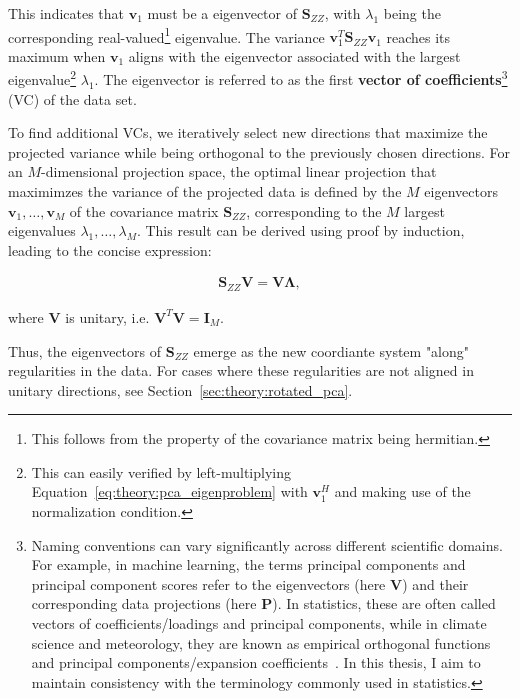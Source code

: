 This indicates that $\bm{v}_1$ must be a eigenvector of $\bm{S}_{ZZ}$, with $\lambda_1$ being the corresponding real-valued\footnote{This follows from the property of the covariance matrix being hermitian.} eigenvalue. The variance $\bm{v}_1^T\bm{S}_{ZZ}\bm{v}_1$ reaches its maximum when $\bm{v}_1$ aligns with the eigenvector associated  with the largest eigenvalue\footnote{This can easily verified by left-multiplying Equation~\eqref{eq:theory:pca_eigenproblem} with $\bm{v}_1^H$ and making use of the normalization condition.} $\lambda_1$. The eigenvector is referred to as the first \textbf{vector of coefficients}\footnote{Naming conventions can vary significantly across different scientific domains. For example, in machine learning, the terms principal components and principal component scores refer to the eigenvectors (here $\bm{V}$) and their corresponding data projections (here $\bm{P}$)\cite[e.g.][]{bishop_pattern_2006}. In statistics, these are often called vectors of coefficients/loadings and principal components\cite[e.g.][]{jolliffe_principal_2002}, while in climate science and meteorology, they are known as empirical orthogonal functions and principal components/expansion coefficients~\cite[e.g.][]{storch_statistical_2003}. In this thesis, I aim to maintain consistency with the terminology commonly used in statistics.} (VC) of the data set.

To find additional VCs, we iteratively select new directions that maximize the projected variance while being orthogonal to the previously chosen directions. For an $M$-dimensional projection space, the optimal linear projection that maximimzes the variance of the projected data is defined by the $M$ eigenvectors $\bm{v}_1,\dots,\bm{v}_M$ of the covariance matrix $\bm{S}_{ZZ}$, corresponding to the $M$ largest eigenvalues $\lambda_1,\dots,\lambda_M$. This result can be derived using proof by induction, leading to the concise expression:

\begin{align}\label{eq:theory:pca_eigenvector_decomposition}
    \bm{S}_{ZZ}  \bm{V} = \bm{V} \bm{\Lambda},
\end{align}

where $\bm{V}$ is unitary, i.e. $\bm{V}^T\bm{V}=\bm{I}_M$.

Thus, the eigenvectors of $\bm{S}_{ZZ}$ emerge as the new coordiante system "along" regularities in the data. For cases where these regularities are not aligned in unitary directions, see Section~\ref{sec:theory:rotated_pca}.

